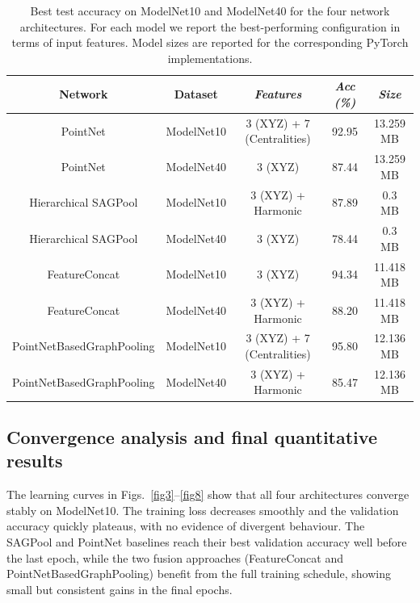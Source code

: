 \documentclass[conference]{IEEEtran}
\begin{document}
\begin{table}[t]
\caption{Best test accuracy on ModelNet10 and ModelNet40 for the four network architectures. For each model we report the best-performing configuration in terms of input features. Model sizes are reported for the corresponding PyTorch implementations.}
\label{tab}
\centering
\begin{tabular}{|c|c|c|c|c|}
\hline
\textbf{Network} & \textbf{Dataset} & \textbf{\textit{Features}} & \textbf{\textit{Acc (\%)}} & \textbf{\textit{Size}} \\
\hline
PointNet & ModelNet10 & 3 (XYZ) + 7 (Centralities) & 92.95 & 13.259 MB \\
\hline
PointNet & ModelNet40 & 3 (XYZ) & 87.44 & 13.259 MB \\
\hline
Hierarchical SAGPool & ModelNet10 & 3 (XYZ) + Harmonic & 87.89 & 0.3 MB \\
\hline
Hierarchical SAGPool & ModelNet40 & 3 (XYZ) & 78.44 & 0.3 MB \\
\hline
FeatureConcat & ModelNet10 & 3 (XYZ) & 94.34 & 11.418 MB \\
\hline
FeatureConcat & ModelNet40 & 3 (XYZ) + Harmonic & 88.20 & 11.418 MB \\
\hline
PointNetBasedGraphPooling & ModelNet10 & 3 (XYZ) + 7 (Centralities) & 95.80 & 12.136 MB \\
\hline
PointNetBasedGraphPooling & ModelNet40 & 3 (XYZ) + Harmonic & 85.47 & 12.136 MB \\
\hline
\end{tabular}
\end{table}

\subsection{Convergence analysis and final quantitative results}

The learning curves in Figs.~\ref{fig3}--\ref{fig8} show that all four
architectures converge stably on ModelNet10. The training loss decreases
smoothly and the validation accuracy quickly plateaus, with no evidence of
divergent behaviour. The SAGPool and PointNet baselines reach their best
validation accuracy well before the last epoch, while the two fusion
approaches (FeatureConcat and PointNetBasedGraphPooling) benefit from the
full training schedule, showing small but consistent gains in the final
epochs.
\end{document}
